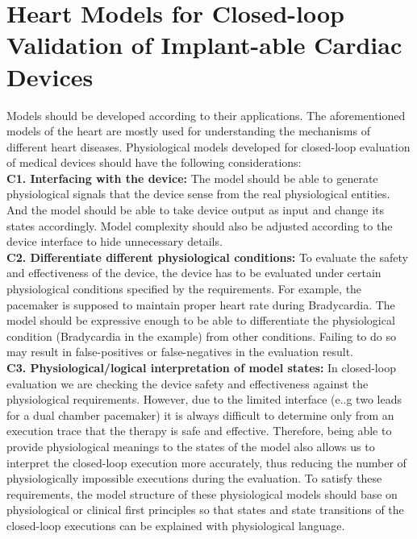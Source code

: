 \section{Heart Models for Closed-loop Validation of   Implant-able Cardiac Devices}
Models should be developed according to their applications. The aforementioned models of the heart are mostly used for understanding the mechanisms of different heart diseases. Physiological models developed for closed-loop evaluation of medical devices should have the following considerations:\\
\textbf{C1. Interfacing with the device: }The model should be able to generate physiological signals that the device sense from the real physiological entities. And the model should be able to take device output as input and change its states accordingly. Model complexity should also be adjusted according to the device interface to hide unnecessary details.\\
\textbf{C2. Differentiate different physiological conditions: }To evaluate the safety and effectiveness of the device, the device has to be evaluated under certain physiological conditions specified by the requirements. For example, the pacemaker is supposed to maintain proper heart rate during Bradycardia. The model should be expressive enough to be able to differentiate the physiological condition (Bradycardia in the example) from other conditions. Failing to do so may result in false-positives or false-negatives in the evaluation result. \\
\textbf{C3. Physiological/logical interpretation of model states: } In closed-loop evaluation we are checking the device safety and effectiveness against the physiological requirements. However, due to the limited interface (e..g two leads for a dual chamber pacemaker) it is always difficult to determine only from an execution trace that the therapy is safe and effective. Therefore, being able to provide physiological meanings to the states of the model also allows us to interpret the closed-loop execution more accurately, thus reducing the number of physiologically impossible executions during the evaluation. To satisfy these requirements, the model structure of these physiological models should base on physiological or clinical first principles so that states and state transitions of the closed-loop executions can be explained with physiological language. \\%
